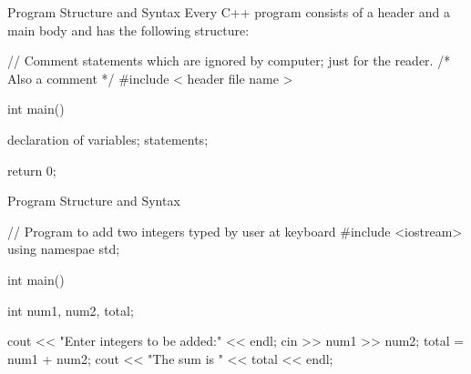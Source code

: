 \documentclass[../lecture1-introduction.tex]{subfiles}
\begin{document}
\begin{frame}[fragile]{Program Structure and Syntax}
    Every C++ program consists of a header and a main body and has the following
    structure:
    \begin{cppcode}
        // Comment statements which are ignored by computer; just for the reader.
        /* Also a comment */
        #include < header file name >

        int main()
        {
            declaration of variables;
            statements;

            return 0;
        }
    \end{cppcode}
\end{frame}

\begin{frame}[fragile]{Program Structure and Syntax}
    \begin{cppcode}
        // Program to add two integers typed by user at keyboard
        #include <iostream>
        using namespae std;

        int main()
        {
            int num1, num2, total;

            cout << "Enter integers to be added:" << endl;
            cin >> num1 >> num2;
            total = num1 + num2;
            cout << "The sum is " << total << endl;

}
\end{cppcode}
\end{frame}
\end{document}
